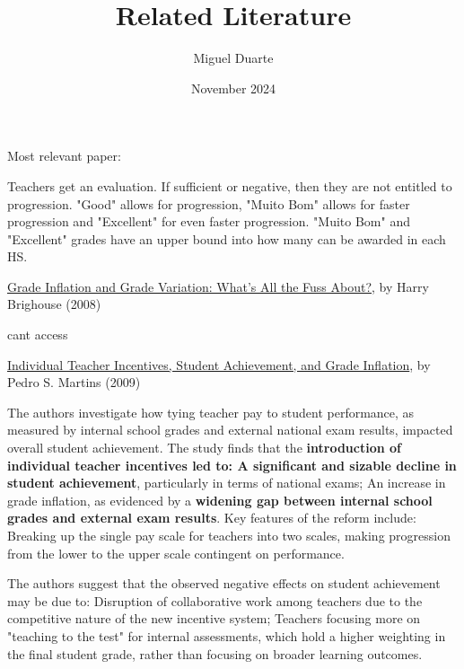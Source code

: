\documentclass{article}
\title{Related Literature}
\author{Miguel Duarte}
\date{November 2024}
\begin{document}
\maketitle

Most relevant paper: \cite{silva2025public}

Teachers get an evaluation. If sufficient or negative, then they are not entitled to progression. "Good" allows for progression, "Muito Bom" allows for faster progression and "Excellent" for even faster progression. "Muito Bom" and "Excellent" grades have an upper bound into how many can be awarded in each HS.




\vspace{5pt}
\href{https://www.degruyter.com/document/doi/10.1515/9780791478004-007/html?srsltid=AfmBOoqNX5V2WbQb7DQAKwi0SG4xrgmtQYzNi9m22tpPYjjfakeslkoV}{Grade Inflation and Grade Variation: What’s All the Fuss About?}, by Harry Brighouse (2008)

cant access

\vspace{5pt} \href{https://www.iza.org/publications/dp/4051/individual-teacher-incentives-student-achievement-and-grade-inflation}{Individual Teacher Incentives, Student Achievement, and Grade Inflation}, by Pedro S. Martins (2009)

The authors investigate how tying teacher pay to student performance, as measured by internal school grades and external national exam results, impacted overall student achievement. The study finds that the \textbf{introduction of individual teacher incentives led to: A significant and sizable decline in student achievement}, particularly in terms of national exams; An increase in grade inflation, as evidenced by a \textbf{widening gap between internal school grades and external exam results}.
Key features of the reform include: 
Breaking up the single pay scale for teachers into two scales, making progression from the lower to the upper scale contingent on performance.

The authors suggest that the observed negative effects on student achievement may be due to:
Disruption of collaborative work among teachers due to the competitive nature of the new incentive system; 
Teachers focusing more on "teaching to the test" for internal assessments, which hold a higher weighting in the final student grade, rather than focusing on broader learning outcomes.
\end{document}
